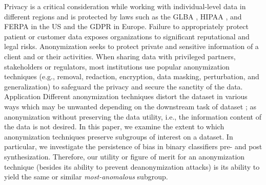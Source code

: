\documentclass[dvipdft]{article}
\begin{document}

Privacy is a critical consideration while working with individual-level data in different regions and is protected by laws such as the GLBA \cite{GLBA}, HIPAA \cite{HIPAA}, and FERPA \cite{FERPA} in the US and the GDPR \cite{GDPR} in Europe. Failure to appropriately protect patient or customer data exposes organizations to significant reputational and legal risks. Anonymization seeks to protect private and sensitive information of a client and or their activities. When sharing data with privileged partners, stakeholders or regulators, most institutions use popular anonymization techniques (e.g., removal, redaction, encryption, data masking, perturbation, and generalization) to safeguard the privacy and secure the sanctity of the data. 
Application 
Different anonymization techniques distort the dataset in various ways which may be unwanted depending on the downstream task of dataset \cite{Wei}; as anonymization without preserving the data utility, i.e., the information content of the data is not desired.
%
In this paper, we examine the extent to which anonymization techniques preserve subgroups of interest on a dataset. In particular, we investigate the persistence of bias in binary classifiers pre- and post synthesization. Therefore, our utility or figure of merit for an anonymization technique (besides its ability to prevent deanonymization attacks) is its ability to yield the same or similar \textit{most-anomalous} subgroup.
\end{document}
